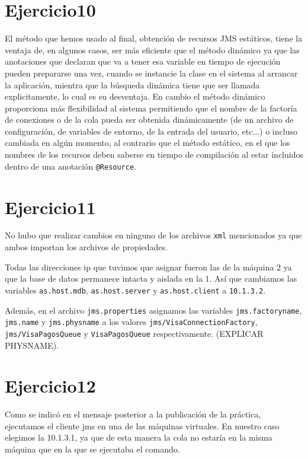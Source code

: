 \documentclass[a4paper, 10pt]{article}
\begin{document}
\section{Ejercicio10}
 	El método que hemos usado al final, obtención de recursos JMS estáticos, tiene la ventaja de, en algunos casos, ser más eficiente que el método dinámico ya que las anotaciones que declaran que va a tener esa variable en tiempo de ejecución pueden prepararse una vez, cuando se instancie la clase en el sistema al arrancar la aplicación, mientra que la búsqueda dinámica tiene que ser llamada explicitamente, lo cual es su desventaja. En cambio el método dinámico proporciona más flexibilidad al sistema permitiendo que el nombre de la factoría de conexiones o de la cola pueda ser obtenida dinámicamente (de un archivo de configuración, de variables de entorno, de la entrada del usuario, etc...) o incluso cambiada en algún momento, al contrario que el método estático, en el que los nombres de los recursos deben saberse en tiempo de compilación al estar incluidos dentro de una anotación \texttt{@Resource}.


\section{Ejercicio11}

	No hubo que realizar cambios en ninguno de los archivos \texttt{xml} mencionados ya que ambos importan los archivos de propiedades.

	Todas las direcciones ip que tuvimos que asignar fueron las de la máquina 2 ya que la base de datos permanece intacta y aislada en la 1. Así que cambiamos las variables \texttt{as.host.mdb}, \texttt{as.host.server} y \texttt{as.host.client} a \texttt{10.1.3.2}. 

	Además, en el archivo \texttt{jms.properties} asignamos las variables \texttt{jms.factoryname}, \texttt{jms.name} y \texttt{jms.physname} a los valores \texttt{jms/VisaConnectionFactory}, \texttt{jms/VisaPagosQueue} y \texttt{VisaPagosQueue} respectivamente. (EXPLICAR PHYSNAME).



\section{Ejercicio12}
	
	Como se indicó en el mensaje posterior a la publicación de la práctica, ejecutamos el cliente jms en una de las máquinas virtuales. En nuestro caso elegimos la 10.1.3.1, ya que de esta manera la cola no estaría en la misma máquina que en la que se ejecutaba el comando.
\end{document}
